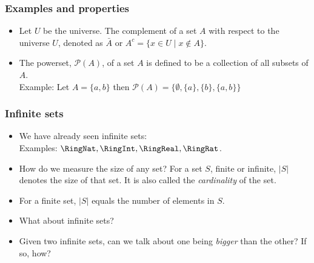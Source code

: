  \begin{frame}[fragile]
\frametitle{Examples and properties}
\begin{itemize}

\item Let $U$ be the universe. The complement of a set $A$ with respect to the universe $U$, denoted as $\bar{A}$ or $A^c = \{x \in U \mid x \notin A\}$.

\item The powerset, $\mathcal{P}(A)$, of a set $A$ is defined to be a collection of all subsets of $A$. \\


Example: Let $A = \{a,b\}$ then $\mathcal{P}(A) = \{ \emptyset, \{a\}, \{b\}, \{a,b\}\}$


\end{itemize}

\end{frame}


 \begin{frame}[fragile]
\frametitle{Infinite sets}
\begin{itemize}
\item We have already seen infinite sets:\\
Examples: $\RingNat, \RingInt, \RingReal, \RingRat$.

\item How do we measure the size of any set? For a set $S$, finite or infinite, $|S|$ denotes the size
of that set. It is also called the {\it cardinality} of the set.

\item For a finite set, $|S|$ equals the number of elements in $S$.

\item What about infinite sets?

\item Given two infinite sets, can we talk about one being {\it bigger} than the other? If so, how?
\end{itemize}
\end{frame}

